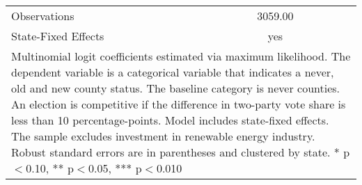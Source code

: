 \begin{table}[!htbp]
\begin{tabular}{l*{2}{c}}
\hline
Observations        &     3059.00   &               \\
State-Fixed Effects &         yes   &               \\
\hline\hline
\multicolumn{3}{p{\linewidth}}{\footnotesize Multinomial logit coefficients estimated via maximum likelihood. The dependent variable is a categorical variable that indicates a never, old and new county status. The baseline category is never counties. An election is competitive if the difference in two-party vote share is less than 10 percentage-points. Model includes state-fixed effects. The sample excludes investment in renewable energy industry. Robust standard errors are in parentheses and clustered by state. * p$<$0.10, ** p$<$0.05, *** p$<$0.010}\\
\end{tabular}
\end{table}
